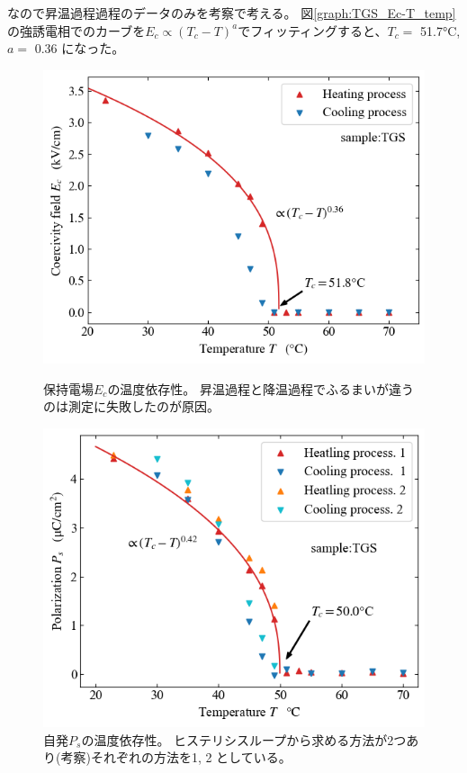 \documentclass[9pt,dvipdfmx,a4paper]{jsarticle}
\begin{document}
なので昇温過程過程のデータのみを考察で考える。
図\ref{graph:TGS_Ec-T_temp}の強誘電相でのカーブを\(E_c\propto(T_c-T)^a\)でフィッティングすると、\(T_c =\) 51.7\si{\degreeCelsius},
\(a =\) 0.36 になった。
\begin{figure}[H]
    \begin{minipage}[t]{0.48\columnwidth}
        \centering
        \includegraphics[width=\columnwidth]{TGS_Ec-T.png}
        \caption{\small{保持電場\(E_c\)の温度依存性。
        昇温過程と降温過程でふるまいが違うのは測定に失敗したのが原因。}}
        \label{graph:TGS_Ec-T_temp}
    \end{minipage}
    \hfill
    \begin{minipage}[t]{0.48\columnwidth}
        \centering
        \includegraphics[width=\columnwidth]{TGS_Ps-T.png}
        \caption{\small{自発\(P_s\)の温度依存性。
        ヒステリシスループから求める方法が2つあり(考察)それぞれの方法を1, 2 としている。}}
        \label{graph:TGS_Ps-T}
    \end{minipage}
\end{figure}
\end{document}
